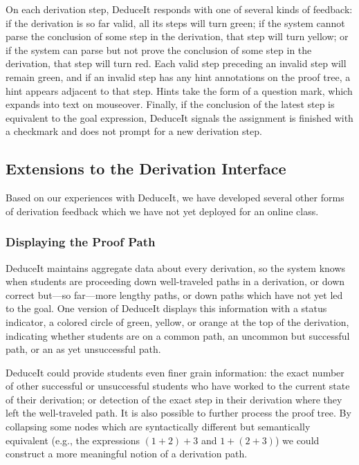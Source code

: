 \documentclass{sigchi}
\newcommand{\msb}[1]{\textbf{\textcolor{cyan}{Michael: #1}}}
\begin{document}
On each derivation step, DeduceIt responds with one of several kinds of feedback: if the derivation is so far valid, all its steps will turn green; if the system cannot parse the conclusion of some step in the derivation, that step will turn yellow; or if the system can parse but not prove the conclusion of some step in the derivation, that step will turn red. Each valid step preceding an invalid step will remain green, and if an invalid step has any hint annotations on the proof tree, a hint appears adjacent to that step. Hints take the form of a question mark, which expands into text on mouseover. Finally, if the conclusion of the latest step is equivalent to the goal expression, DeduceIt signals the assignment is finished with a checkmark and does not prompt for a new derivation step.

\subsection{Extensions to the Derivation Interface}

Based on our experiences with DeduceIt, we have developed several other forms of derivation feedback which we have not yet deployed for an online class.

\subsubsection{Displaying the Proof Path}

DeduceIt maintains aggregate data about every derivation, so the system knows when students are proceeding down well-traveled paths in a derivation, or down correct but---so far---more lengthy paths, or down paths which have not yet led to the goal. One version of DeduceIt displays this information with a status indicator, a colored circle of green, yellow, or orange at the top of the derivation, indicating whether students are on a common path, an uncommon but successful path, or an as yet unsuccessful path. 

DeduceIt could provide students even finer grain information: the exact number of other successful or unsuccessful students who have worked to the current state of their derivation; or detection of the exact step in their derivation where they left the well-traveled path. It is also possible to further process the proof tree. By collapsing some nodes which are syntactically different but semantically equivalent (e.g., the expressions $(1+2)+3$ and $1+(2+3)$) we could construct a more meaningful notion of a derivation path. %
\end{document}
